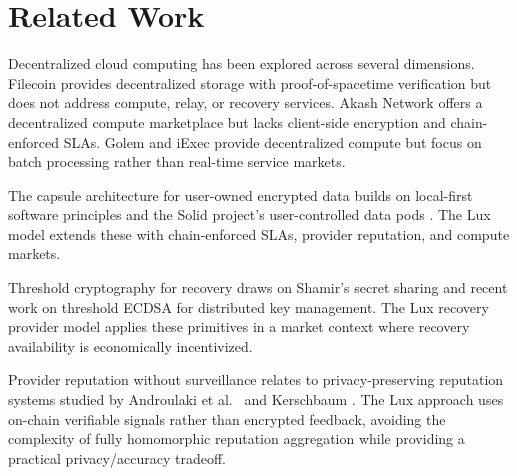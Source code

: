 \section{Related Work}
\label{sec:related}

Decentralized cloud computing has been explored across several
dimensions. Filecoin \cite{benet2017filecoin} provides decentralized
storage with proof-of-spacetime verification but does not address
compute, relay, or recovery services. Akash Network \cite{akash2020}
offers a decentralized compute marketplace but lacks client-side
encryption and chain-enforced SLAs. Golem \cite{golem2016} and
iExec \cite{iexec2017} provide decentralized compute but focus on
batch processing rather than real-time service markets.

The capsule architecture for user-owned encrypted data builds on
local-first software principles \cite{kleppmann2019localfirst} and
the Solid project's user-controlled data pods \cite{bernerslee2016solid}.
The Lux model extends these with chain-enforced SLAs, provider
reputation, and compute markets.

Threshold cryptography for recovery draws on Shamir's secret sharing
\cite{shamir1979share} and recent work on threshold ECDSA
\cite{gennaro2020frost} for distributed key management. The Lux
recovery provider model applies these primitives in a market context
where recovery availability is economically incentivized.

Provider reputation without surveillance relates to privacy-preserving
reputation systems studied by Androulaki et al.\ \cite{androulaki2008reputation}
and Kerschbaum \cite{kerschbaum2009reputation}. The Lux approach uses
on-chain verifiable signals rather than encrypted feedback, avoiding
the complexity of fully homomorphic reputation aggregation while
providing a practical privacy/accuracy tradeoff.

